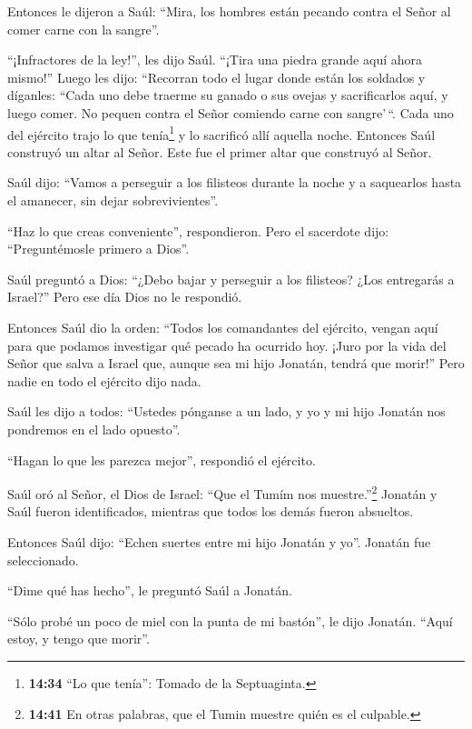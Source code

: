  Entonces le dijeron a Saúl: ``Mira, los hombres están
pecando contra el Señor al comer carne con la sangre''.

``¡Infractores de la ley!'', les dijo Saúl. ``¡Tira una piedra grande
aquí ahora mismo!''  Luego les dijo: ``Recorran todo el
lugar donde están los soldados y díganles: ``Cada uno debe traerme su
ganado o sus ovejas y sacrificarlos aquí, y luego comer. No pequen
contra el Señor comiendo carne con sangre'\,``. Cada uno del ejército
trajo lo que tenía\footnote{\textbf{14:34} ``Lo que tenía'': Tomado de
  la Septuaginta.} y lo sacrificó allí aquella noche. 
Entonces Saúl construyó un altar al Señor. Este fue el primer altar que
construyó al Señor.

 Saúl dijo: ``Vamos a perseguir a los filisteos durante la
noche y a saquearlos hasta el amanecer, sin dejar sobrevivientes''.

``Haz lo que creas conveniente'', respondieron. Pero el sacerdote dijo:
``Preguntémosle primero a Dios''.

 Saúl preguntó a Dios: ``¿Debo bajar y perseguir a los
filisteos? ¿Los entregarás a Israel?'' Pero ese día Dios no le
respondió.

 Entonces Saúl dio la orden: ``Todos los comandantes del
ejército, vengan aquí para que podamos investigar qué pecado ha ocurrido
hoy.  ¡Juro por la vida del Señor que salva a Israel que,
aunque sea mi hijo Jonatán, tendrá que morir!'' Pero nadie en todo el
ejército dijo nada.

 Saúl les dijo a todos: ``Ustedes pónganse a un lado, y yo
y mi hijo Jonatán nos pondremos en el lado opuesto''.

``Hagan lo que les parezca mejor'', respondió el ejército.

 Saúl oró al Señor, el Dios de Israel: ``Que el Tumím nos
muestre.''\footnote{\textbf{14:41} En otras palabras, que el Tumin
  muestre quién es el culpable.} Jonatán y Saúl fueron identificados,
mientras que todos los demás fueron absueltos.

 Entonces Saúl dijo: ``Echen suertes entre mi hijo Jonatán
y yo''. Jonatán fue seleccionado.

 ``Dime qué has hecho'', le preguntó Saúl a Jonatán.

``Sólo probé un poco de miel con la punta de mi bastón'', le dijo
Jonatán. ``Aquí estoy, y tengo que morir''.

